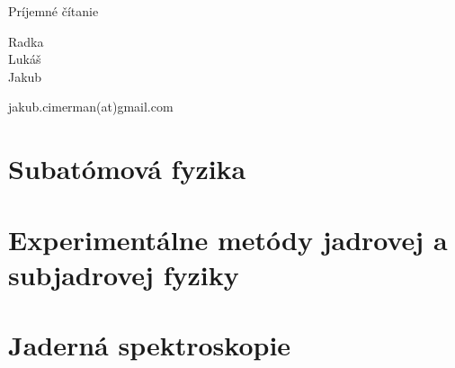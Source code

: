 \documentclass[12pt]{book}
\begin{document}
Príjemné čítanie

\begin{flushright}
Radka\\
Lukáš\\
Jakub
\end{flushright}

\vspace{5cm}
jakub.cimerman(at)gmail.com

\newpage

\tableofcontents

\newpage

\part{Subatómová fyzika}

















\part{Experimentálne metódy jadrovej a subjadrovej fyziky}















\part{Jaderná spektroskopie}










\end{document}
